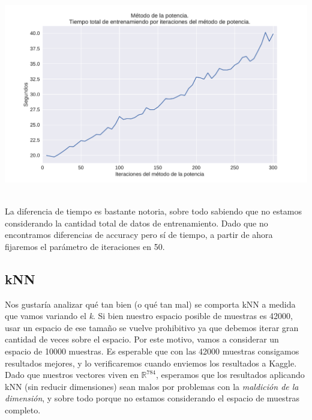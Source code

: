 {\centering
    \includegraphics[scale=0.55]{informe/imagenes/potencia/tiempoPorIters.pdf} \\
}
$ $\newline

La diferencia de tiempo es bastante notoria, sobre todo sabiendo que no estamos considerando la cantidad total de datos de entrenamiento. Dado que no encontramos diferencias de accuracy pero sí de tiempo, a partir de ahora fijaremos el parámetro de iteraciones en 50. \\

\subsection{kNN}


Nos gustaría analizar qué tan bien (o qué tan mal) se comporta kNN a medida que vamos variando el \textit{k}. Si bien nuestro espacio posible de muestras es 42000, usar un espacio de ese tamaño se vuelve prohibitivo ya que debemos iterar gran cantidad de veces sobre el espacio. Por este motivo, vamos a considerar un espacio de 10000 muestras. Es esperable que con las 42000 muestras consigamos resultados mejores, y lo verificaremos cuando enviemos los resultados a Kaggle. \\

Dado que nuestros vectores viven en $\mathbb{R}^{784}$, esperamos que los resultados aplicando kNN (sin reducir dimensiones) sean malos por problemas con la \textit{maldición de la dimensión}, y sobre todo porque no estamos considerando el espacio de muestras completo. \\


